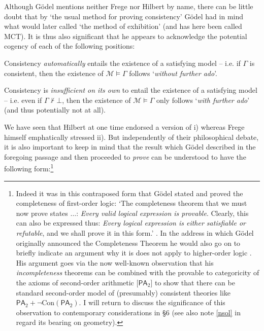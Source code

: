 \documentclass[11pt,fleqn,leqno]{article}
\def\proves{\vdash}
\begin{document}
Although G\"odel mentions neither Frege nor Hilbert by name, there can be little doubt that by  `the usual method for proving consistency' G\"odel had in mind what \citet{Hilbert1934} would later called `the method of exhibition' (and has here been called MCT).  It is thus also significant that he appears to acknowledge the potential cogency of each of the following positions:
\begin{compactenum}[i)]
\item Consistency \textsl{automatically} entails the existence of a satisfying model -- i.e. if $\Gamma$ is consistent, then the existence of $\mathcal{M} \models \Gamma$ follows `\textsl{without further ado}'.
\item Consistency is \textsl{insufficient on its own} to entail the existence of a satisfying model -- i.e. even if $\Gamma \not\proves \bot$, then the existence of $\mathcal{M} \models \Gamma$ only follows `\textsl{with further ado}' (and thus potentially not at all).   
\end{compactenum}

We have seen that Hilbert at one time endorsed a version of i) whereas Frege himself emphatically stressed ii).   But independently of their philosophical debate, it is also important to keep in mind that the result which G\"odel described in the foregoing passage and then proceeded to \textsl{prove} can be understood to have the following form:\footnote{Indeed it was in this contraposed form that G\"odel stated and proved the completeness of first-order logic: `The completeness theorem that we must now prove states $\ldots$: \textsl{Every valid logical expression is provable}. Clearly, this can also be expressed thus: \textsl{Every logical expression is either satisfiable or refutable}, and we shall prove it in this form.' \citeyearpar[pp. 74-75]{Godel1929a}.   In the address in which G\"odel originally announced the Completeness Theorem he would also go on to briefly indicate an argument why it is does not apply to higher-order logic \citeyearpar[p. 29]{Godel1930c}.    His argument goes via the now well-known observation that his \textsl{incompleteness} theorems can be combined with the provable to categoricity of the axioms of second-order arithmetic $[\mathsf{PA}_2$] to show that there can be standard second-order model of (presumably) consistent theories like $\mathsf{PA}_2 + \neg \mathrm{Con}(\mathsf{PA_2})$.   I will return to discuss the significance of this observation to contemporary considerations in \S 6 (see also note \ref{nsol} in regard its bearing on geometry).}
\end{document}
